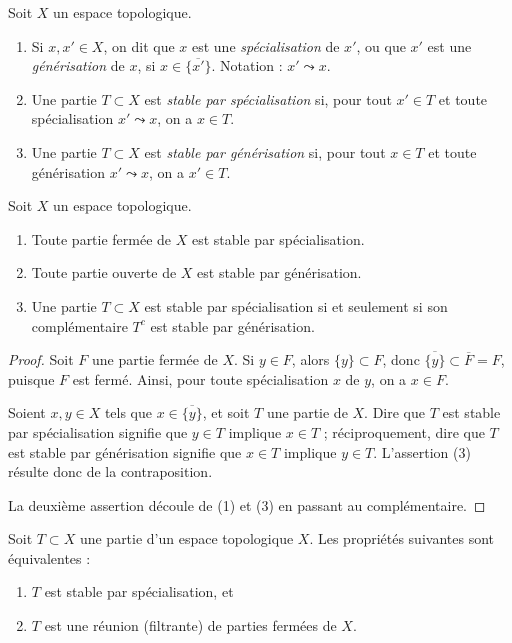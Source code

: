\begin{definition}
\label{definition-specialization}
Soit $X$ un espace topologique.
\begin{enumerate}
\item Si $x, x' \in X$, on dit que $x$ est une {\it spécialisation} de $x'$,
ou que $x'$ est une {\it générisation} de $x$, si
$x \in \overline{\{x'\}}$. Notation : $x' \leadsto x$.
\item Une partie $T \subset X$ est {\it stable par spécialisation} si, pour
tout $x' \in T$ et toute spécialisation $x' \leadsto x$, on a $x \in T$.
\item Une partie $T \subset X$ est {\it stable par générisation} si, pour tout
$x \in T$ et toute générisation $x' \leadsto x$, on a $x' \in T$.
\end{enumerate}
\end{definition}

\begin{lemma}
\label{lemma-open-closed-specialization}
Soit $X$ un espace topologique.
\begin{enumerate}
\item Toute partie fermée de $X$ est stable par spécialisation.
\item Toute partie ouverte de $X$ est stable par générisation.
\item Une partie $T \subset X$ est stable par spécialisation si et seulement
si son complémentaire $T^c$ est stable par générisation.
\end{enumerate}
\end{lemma}

\begin{proof}
Soit $F$ une partie fermée de $X$. Si $y\in F$, alors $\{y\} \subset F$, donc
$\overline{\{y\}} \subset \overline{F} = F$, puisque $F$ est fermé. Ainsi,
pour toute spécialisation $x$ de $y$, on a $x\in F$.

\medskip\noindent
Soient $x, y\in X$ tels que $x\in \overline{\{y\}}$, et soit $T$ une partie
de $X$. Dire que $T$ est stable par spécialisation signifie que $y\in T$
implique $x\in T$ ; réciproquement, dire que $T$ est stable par générisation
signifie que $x\in T$ implique $y\in T$. L'assertion (3) résulte donc de la
contraposition.

\medskip\noindent
La deuxième assertion découle de (1) et (3) en passant au complémentaire.
\end{proof}

\begin{lemma}
\label{lemma-stable-specialization}
Soit $T \subset X$ une partie d'un espace topologique $X$.
Les propriétés suivantes sont équivalentes :
\begin{enumerate}
\item $T$ est stable par spécialisation, et
\item $T$ est une réunion (filtrante) de parties fermées de $X$.
\end{enumerate}
\end{lemma}

